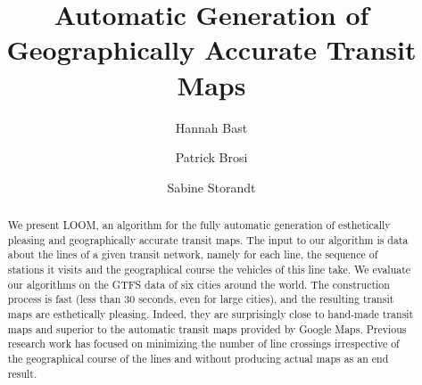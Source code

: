 \documentclass{llncs}
\begin{document}
%
\mainmatter
%
\title{Automatic Generation of Geographically Accurate Transit Maps}
%
%
\author{Hannah Bast \and Patrick Brosi \and
Sabine Storandt}
%
%
%

\maketitle

\begin{abstract}
	We present LOOM, an algorithm for the fully automatic generation of esthetically pleasing and geographically accurate transit maps.
	The input to our algorithm is data about the lines of a given transit network, namely for each line, the sequence of stations it visits and the 
	geographical course the vehicles of this line take.
	We evaluate our algorithms on the GTFS data of six cities around the world.
	The construction process is fast (less than 30 seconds, even for large cities), and the resulting transit maps are esthetically pleasing.
	Indeed, they are surprisingly close to hand-made transit maps and superior to the automatic transit maps provided by Google Maps.
	Previous research work has focused on minimizing the number of line crossings irrespective of the geographical course of the lines and without 
	producing actual maps as an end result.
\end{abstract}
\end{document}
